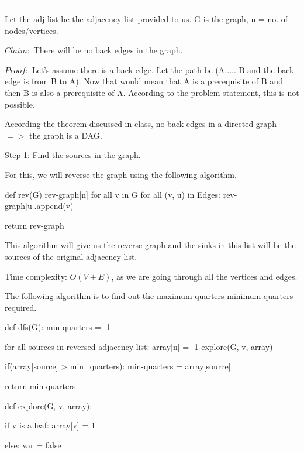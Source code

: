 \documentclass{exam}
\begin{document}
\vspace{0.1in}

\vspace{0.1in}
\hrule
 \vspace{0.2in}





\vspace{0.1in}
Let the adj-list be the adjacency list provided to us. G is the graph, n = no. of nodes/vertices.


$Claim:$ There will be no back edges in the graph.

$Proof:$ Let's assume there is a back edge. Let the path be (A..... B and the back edge is from  B to A). Now that would mean that A is a prerequisite of B and then B is also a prerequisite of A. According to the problem statement, this is not possible. 

According the theorem discussed in class, no back edges in a directed graph $=>$ the graph is a DAG.

Step 1: Find the sources in the graph.

For this, we will reverse the graph using the following algorithm.

def rev(G)
    rev-graph[n]
    for all v in G
        for all (v, u) in Edges:
            rev-graph[u].append(v)
            
    return rev-graph

This algorithm will give us the reverse graph and the sinks in this list will be the sources of the original adjacency list.

Time complexity: $O(V + E)$, as we are going through all the vertices and edges.


The following algorithm is to find out the maximum quarters minimum quarters required.

def dfs(G):
    min-quarters = -1
    
    for all sources in reversed adjacency list:
        array[n] = {-1}
        explore(G, v, array)
        
        if(array[source] > min_quarters):
            min-quarters = array[source]
            
    return min-quarters
    
def explore(G, v, array):
     
    if v is a leaf:
        array[v] = 1
        
    else:
        var = false
        
\end{document}
